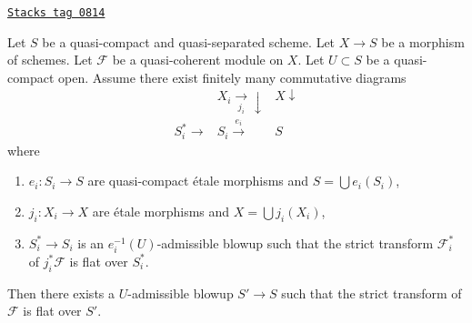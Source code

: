 \begin{lemma}
\label{flat-lemma-flatten-module-etale-localize}
\href{https://stacks.math.columbia.edu/tag/0814}{\texttt{Stacks tag 0814}}

Let $S$ be a quasi-compact and quasi-separated scheme.
Let $X \to S$ be a morphism of schemes.
Let $\mathcal{F}$ be a quasi-coherent module on $X$.
Let $U \subset S$ be a quasi-compact open.
Assume there exist finitely many commutative diagrams
$$
\begin{array}{ccc} & X_i \underset{j_i}{\longrightarrow}\downarrow & X \downarrow \\ S_i^* \longrightarrow & S_i \overset{e_i}{\longrightarrow} & S\end{array}
$$
where
\begin{enumerate}
\item $e_i : S_i \to S$ are quasi-compact \'etale morphisms and
$S = \bigcup e_i(S_i)$,
\item $j_i : X_i \to X$ are \'etale morphisms and
$X = \bigcup j_i(X_i)$,
\item $S^*_i \to S_i$ is an $e_i^{-1}(U)$-admissible blowup
such that the strict transform $\mathcal{F}_i^*$ of $j_i^*\mathcal{F}$
is flat over $S^*_i$.
\end{enumerate}
Then there exists a $U$-admissible blowup $S' \to S$ such that
the strict transform of $\mathcal{F}$ is flat over $S'$.
\end{lemma}

